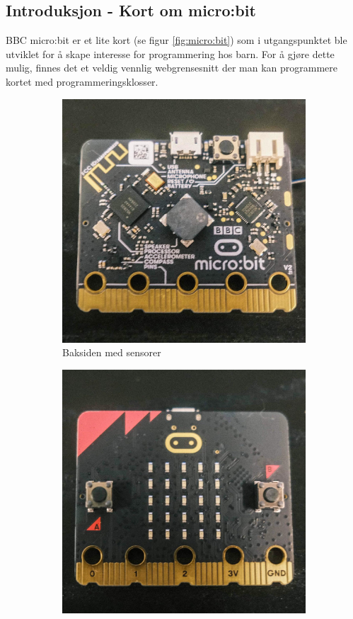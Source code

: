 \begin{alphasection}
\section{Introduksjon - Kort om micro:bit}
BBC micro:bit er et lite kort (se figur \ref{fig:micro:bit}) som i utgangspunktet ble utviklet for å skape interesse for programmering hos barn. For å gjøre dette mulig, finnes det et veldig vennlig webgrensesnitt der man kan programmere kortet med programmeringsklosser. 

\begin{figure}[H]
    \centering
    \begin{subfigure}{0.5\textwidth}
    \centering
        \includegraphics[width=.8\linewidth]{Main/figures/microbit1}
        \caption{Baksiden med sensorer}
        \label{fig:inclu}
    \end{subfigure}%
    \begin{subfigure}{0.5\textwidth}
    \centering
        \includegraphics[width=0.8\linewidth]{Main/figures/microbit2}

\end{subfigure}
\end{figure}
\end{alphasection}
